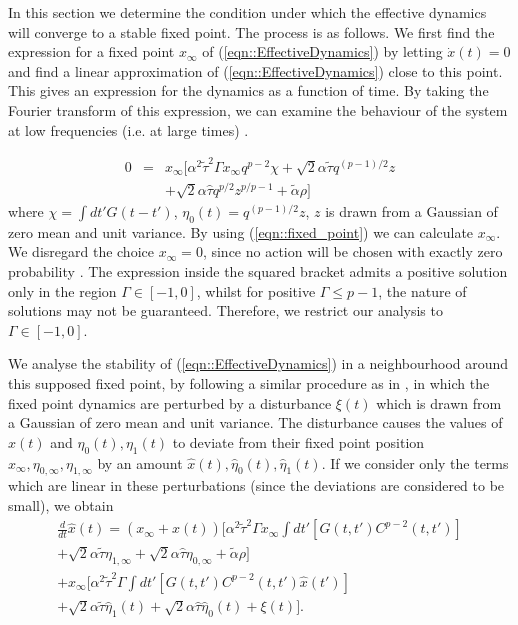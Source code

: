 \documentclass{article}
\newcommand{\talpha}{\tilde{\alpha}}
\newcommand{\ttau}{\tilde{\tau}}
\newcommand{\htau}{\hat{\tau}}
\newcommand{\xfixed}{x_\infty}
\newcommand{\ezerof}{\eta_{0, \infty}}
\newcommand{\eonef}{\eta_{1, \infty}}
\newcommand{\xpert}{\hat{x}(t)}
\newcommand{\xpertdash}{\hat{x}(t')}
\newcommand{\ezeropert}{\hat{\eta}_0(t)}
\newcommand{\eonepert}{\hat{\eta}_1(t)}
\begin{document}
In this section we determine the condition under which the effective dynamics will converge to a stable fixed point. The process is as follows. We first find the expression for a fixed point $\xfixed$ of (\ref{eqn::EffectiveDynamics}) by letting $\dot{x}(t)= 0$ and find a linear approximation of (\ref{eqn::EffectiveDynamics}) close to this point. This gives an expression for the dynamics as a function of time. By taking the Fourier transform of this expression, we can examine the behaviour of the system at low frequencies (i.e. at large times) \cite{sewell:fourier}.

%
\begin{eqnarray}
    0 & = & \xfixed [ \alpha^2 \ttau^2 \Gamma \xfixed q^{p-2} \chi + \sqrt{2} \alpha \ttau q^{(p-1)/2}z \nonumber \\ && + \sqrt{2} \alpha \htau q^{p/2} z^{p/p-1} + \talpha \rho]
    \label{eqn::fixed_point}
\end{eqnarray}
%
where $\chi = \int dt' G(t - t')$, $\eta_0(t) = q^{(p-1)/2}z$, $z$ is
drawn from a Gaussian of zero mean and unit variance. By using (\ref{eqn::fixed_point}) we can
calculate $\xfixed$. We disregard the choice $\xfixed = 0$, since
no action will be chosen with exactly zero probability \cite{coolen:minority}. The expression inside the squared bracket
admits a positive solution only in the region $\Gamma \in [-1, 0]$,
whilst for positive $\Gamma \leq p-1$, the nature of solutions may
not be guaranteed. Therefore, we restrict our analysis to 
$\Gamma \in [-1, 0]$.

We analyse the stability of (\ref{eqn::EffectiveDynamics}) in a neighbourhood around
this supposed fixed point, by following a similar procedure as in \cite{opper:phase}, in
which the fixed point dynamics are 
perturbed by a
disturbance $\xi(t)$ which is drawn from a Gaussian of zero mean and
unit variance. The disturbance causes the values of $x(t)$ and
$\eta_0(t), \eta_1(t)$ to deviate from their fixed point position
$\xfixed, \ezerof, \eonef$ by an amount $\xpert, \ezeropert,
\eonepert$.  If we consider only the terms which are linear in these
perturbations (since the deviations are considered to be small), we obtain 
%
\begin{eqnarray}
\frac{d}{dt} \xpert=(\xfixed + \xpert) [ \alpha^2 \ttau^2 \Gamma \xfixed \int dt' [ G(t, t')C^{p - 2}(t, t') ] \nonumber \\
  + \sqrt{2} \alpha \ttau \eonef + \sqrt{2} \alpha \htau \ezerof + \talpha \rho] \nonumber \\
  + \xfixed [\alpha^2 \ttau^2 \Gamma \int dt' [ G(t, t')C^{p - 2}(t, t') \xpertdash ] \nonumber \\
   + \sqrt{2} \alpha \ttau \eonepert + \sqrt{2} \alpha \htau \ezeropert + \xi(t)] \nonumber.
\label{eqn::Linearised}
\end{eqnarray}
\end{document}
